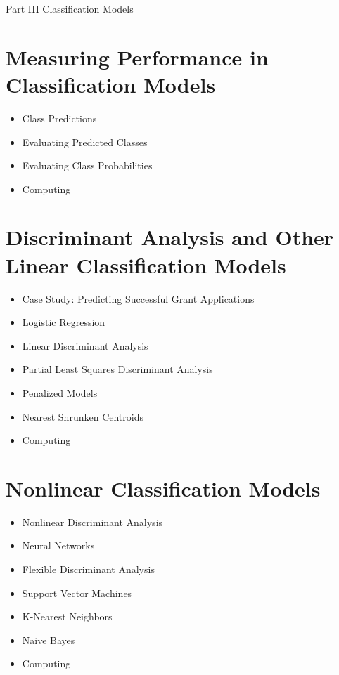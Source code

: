 Part III Classification Models
\section{Measuring Performance in Classification Models} 
\begin{itemize}
\item Class Predictions  
\item Evaluating Predicted Classes  
\item Evaluating Class Probabilities 
\item Computing 
\end{itemize} 
\section{Discriminant Analysis and Other Linear Classification
Models} 
\begin{itemize}
\item Case Study: Predicting Successful Grant Applications  
\item Logistic Regression  
\item Linear Discriminant Analysis 
\item Partial Least Squares Discriminant Analysis  
\item Penalized Models  
\item Nearest Shrunken Centroids  
\item Computing 
\end{itemize} 
\section{Nonlinear Classification Models} 
\begin{itemize}  
\item Nonlinear Discriminant Analysis
\item Neural Networks  
\item Flexible Discriminant Analysis 
\item Support Vector Machines 
\item K-Nearest Neighbors 
\item Naive Bayes 
\item Computing 
\end{itemize} 

